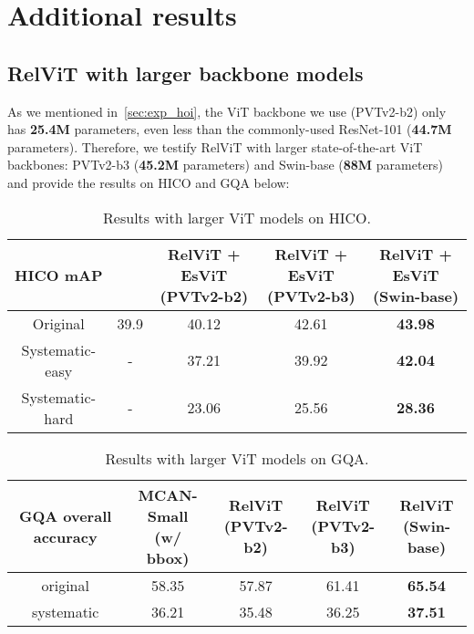 \documentclass{article} \usepackage{iclr2022_conference,times}
\begin{document}
\section{Additional results}








\subsection{RelViT with larger backbone models}

As we mentioned in~\autoref{sec:exp_hoi}, the ViT backbone we use (PVTv2-b2) only has \textbf{25.4M} parameters, even less than the commonly-used ResNet-101 (\textbf{44.7M} parameters). Therefore, we testify RelViT with larger state-of-the-art ViT backbones: PVTv2-b3 (\textbf{45.2M} parameters) and Swin-base (\textbf{88M} parameters)~\citep{liu2021swin} and provide the results on HICO and GQA below:

\begin{table}[h]
\centering
\caption{Results with larger ViT models on HICO.}
\setlength\tabcolsep{4pt}
\begin{tabular}{ccccc}
\toprule
HICO mAP        & \cite{fang2018pairwise} & \makecell[tc]{RelViT + EsViT \\(PVTv2-b2)} & \makecell[tc]{RelViT + EsViT\\(PVTv2-b3)} & \makecell[tc]{RelViT + EsViT\\(Swin-base)} \\
\midrule
Original        & 39.9               & 40.12                     & 42.61                     & \textbf{43.98}                  \\
Systematic-easy & -                  & 37.21                     & 39.92                     & \textbf{42.04}                  \\
Systematic-hard & -                  & 23.06                     & 25.56                     & \textbf{28.36} \\                
\bottomrule
\end{tabular}
\end{table}

\begin{table}[h]
\centering
\caption{Results with larger ViT models on GQA.}
\setlength\tabcolsep{4pt}
\begin{tabular}{ccccc}
\toprule
GQA overall accuracy & \makecell[tc]{MCAN-Small\\(w/ bbox)} & \makecell[tc]{RelViT\\(PVTv2-b2)} & \makecell[tc]{RelViT\\(PVTv2-b3)} & \makecell[tc]{RelViT\\(Swin-base)} \\
\midrule
original             & 58.35             & 57.87             & 61.41             & \textbf{65.54}          \\
systematic           & 36.21             & 35.48             & 36.25             & \textbf{37.51}         \\
\bottomrule
\end{tabular}
\end{table}
\end{document}
